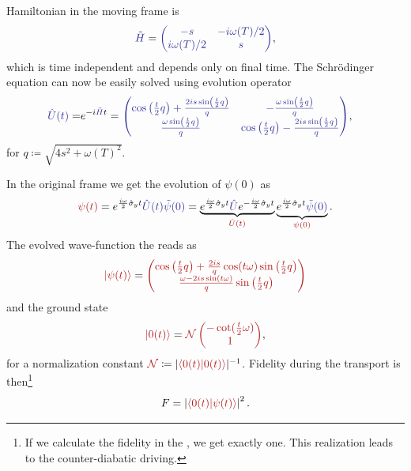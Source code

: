 Hamiltonian in the moving frame is
\begin{equation}
    \bluee{\tilde H}=\bluee{\begin{pmatrix}
        -s&-i\omega(T)/2\\
        i\omega(T)/2&s
    \end{pmatrix}},
\end{equation}
which is time independent and depends only on final time. The Schr\"odinger equation can now be easily solved using evolution operator
\begin{equation}
    \begin{split}
        \bluee{\UU(t)}=&e^{-i\bluee{\tilde H}t}
        =\bluee{\begin{pmatrix}
            \cos \left(\frac{t}{2} q\right)+\frac{2 i s \sin \left(\frac{t}{2} q\right)}{q} & -\frac{\omega  \sin \left(\frac{t}{2} q\right)}{q} \\
            \frac{\omega  \sin \left(\frac{t}{2} q\right)}{q} & \cos \left(\frac{t}{2} q\right)-\frac{2 i s \sin \left(\frac{t}{2} q\right)}{q} \\
        \end{pmatrix}},
    \end{split}
    \label{eq:evolutionBlue}
\end{equation}
for $q\coloneqq\sqrt{4 s^2+\omega(T) ^2}$.

In the original frame we get the evolution of $\psi(0)$ as
\begin{equation}
    \redd{\psi(t)}=\expsp \bluee{\UU(t) \tilde\psi(0)} = \underbrace{\expsp \bluee{\UU}\expsm}_{\redd{\UU(t)}} \underbrace{\expsp \bluee{\tilde\psi(0)}}_{\redd{\psi(0)}}.
\end{equation}
The evolved wave-function the reads as
\begin{equation}
    \redd{\ket{\psi(t)}}=\redd{\begin{pmatrix}
        \cos \left(\frac{t}{2} q\right)+\frac{2 i s}{q} \cos (t \omega ) \sin \left(\frac{t}{2} q\right)\\
        \frac{\omega -2 i s\sin (t \omega )}{q}  \sin \left(\frac{t}{2} q\right)
    \end{pmatrix}}
\end{equation}
and the ground state
\begin{equation}
    \redd{\ket{0(t)}}=\redd{\mathcal{N}\begin{pmatrix}
        -\cot (\frac{t}{2}\omega)\\
        1
    \end{pmatrix}},
\end{equation}
for a normalization constant $\redd{\mathcal{N}}\coloneqq |\redd{\braket{0(t)|0(t)}}|^{-1}$.
Fidelity during the transport is then\footnote{If we calculate the fidelity in the , we get exactly one. This realization leads to the counter-diabatic driving.}
\begin{equation}
    F=\left|\redd{\braket{0(t)|\psi(t)}}\right|^2.
    \label{fid:definition}
\end{equation}

